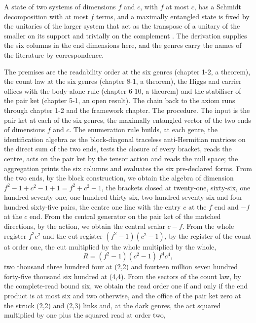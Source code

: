 \begin{chbridge}
A state of two systems of dimensions $f$ and $c$, with $f$ at most $c$, has a Schmidt decomposition with at most $f$ terms, and a maximally entangled state is fixed by the unitaries of the larger system that act as the transpose of a unitary of the smaller on its support and trivially on the complement \cite{Schmidt1907,Horodecki2009}. The derivation supplies the six columns in the end dimensions here, and the genres carry the names of the literature by correspondence.
\end{chbridge}
\begin{chproof}
The premises are the readability order at the six genres (chapter 1-2, a theorem), the count law at the six genres (chapter 8-1, a theorem), the Higgs and carrier offices with the body-alone rule (chapter 6-10, a theorem) and the stabiliser of the pair ket (chapter 5-1, an open result). The chain back to the axiom runs through chapter 1-2 and the framework chapter. The procedure. The input is the pair ket at each of the six genres, the maximally entangled vector of the two ends of dimensions $f$ and $c$. The enumeration rule builds, at each genre, the identification algebra as the block-diagonal traceless anti-Hermitian matrices on the direct sum of the two ends, tests the closure of every bracket, reads the centre, acts on the pair ket by the tensor action and reads the null space; the aggregation prints the six columns and evaluates the six pre-declared forms. From the two ends, by the block construction, we obtain the algebra of dimension $f^{2} - 1 + c^{2} - 1 + 1 = f^{2} + c^{2} - 1$, the brackets closed at twenty-one, sixty-six, one hundred seventy-one, one hundred thirty-six, two hundred seventy-six and four hundred sixty-five pairs, the centre one line with the entry $c$ at the $f$ end and $-f$ at the $c$ end. From the central generator on the pair ket of the matched directions, by the action, we obtain the central scalar $c - f$. From the whole register $f^{2} c^{2}$ and the cut register $(f^{2} - 1)(c^{2} - 1)$, by the register of the count at order one, the cut multiplied by the whole multiplied by the whole,
\begin{equation}
R = (f^{2} - 1)(c^{2} - 1)\, f^{4} c^{4} ,
\end{equation}
two thousand three hundred four at (2,2) and fourteen million seven hundred forty-five thousand six hundred at (4,4). From the sectors of the count law, by the complete-read bound six, we obtain the read order one if and only if the end product is at most six and two otherwise, and the office of the pair ket zero at the struck (2,2) and (2,3) links and, at the dark genres, the act squared multiplied by one plus the squared read at order two,

\end{chproof}
